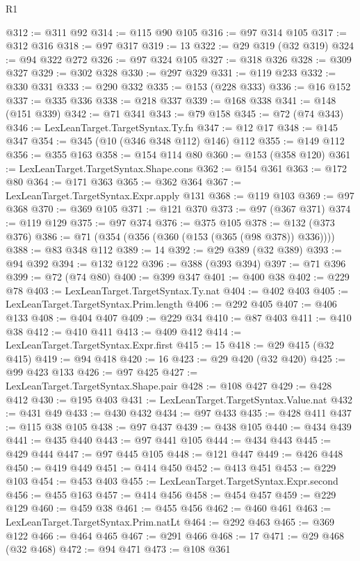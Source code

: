 \begin{lexlean}{R1}
\begin{coremodule}
@312 := @311 @92
@314 := @115 @90 @105
@316 := @97 @314 @105
@317 := @312 @316
@318 := @97 @317
@319 := 13
@322 := @29 @319 (@32 @319)
@324 := @94 @322 @272
@326 := @97 @324 @105
@327 := @318 @326
@328 := @309 @327
@329 := @302 @328
@330 := @297 @329
@331 := @119 @233
@332 := @330 @331
@333 := @290 @332
@335 := @153 (@228 @333)
@336 := @16 @152
@337 := @335 @336
@338 := @218 @337
@339 := @168 @338
@341 := @148 (@151 @339)
@342 := @71 @341
@343 := @79 @158
@345 := @72 (@74 @343)
@346 := LexLeanTarget.TargetSyntax.Ty.fn
@347 := @12 @17
@348 := @145 @347
@354 := @345 (@10 (@346 @348 @112) @146) @112
@355 := @149 @112
@356 := @355 @163
@358 := @154 @114 @80
@360 := @153 (@358 @120)
@361 := LexLeanTarget.TargetSyntax.Shape.cons
@362 := @154 @361
@363 := @172 @80
@364 := @171 @363
@365 := @362 @364
@367 := LexLeanTarget.TargetSyntax.Expr.apply @131
@368 := @119 @103
@369 := @97 @368
@370 := @369 @105
@371 := @121 @370
@373 := @97 (@367 @371)
@374 := @119 @129
@375 := @97 @374
@376 := @375 @105
@378 := @132 (@373 @376)
@386 := @71 (@354 (@356 (@360 (@153 (@365 (@98 @378)) @336))))
@388 := @83 @348 @112
@389 := 14
@392 := @29 @389 (@32 @389)
@393 := @94 @392
@394 := @132 @122
@396 := @388 (@393 @394)
@397 := @71 @396
@399 := @72 (@74 @80)
@400 := @399 @347
@401 := @400 @38
@402 := @229 @78
@403 := LexLeanTarget.TargetSyntax.Ty.nat
@404 := @402 @403
@405 := LexLeanTarget.TargetSyntax.Prim.length
@406 := @292 @405
@407 := @406 @133
@408 := @404 @407
@409 := @229 @34
@410 := @87 @403
@411 := @410 @38
@412 := @410 @411
@413 := @409 @412
@414 := LexLeanTarget.TargetSyntax.Expr.first
@415 := 15
@418 := @29 @415 (@32 @415)
@419 := @94 @418
@420 := 16
@423 := @29 @420 (@32 @420)
@425 := @99 @423 @133
@426 := @97 @425
@427 := LexLeanTarget.TargetSyntax.Shape.pair
@428 := @108 @427
@429 := @428 @412
@430 := @195 @403
@431 := LexLeanTarget.TargetSyntax.Value.nat
@432 := @431 @49
@433 := @430 @432
@434 := @97 @433
@435 := @428 @411
@437 := @115 @38 @105
@438 := @97 @437
@439 := @438 @105
@440 := @434 @439
@441 := @435 @440
@443 := @97 @441 @105
@444 := @434 @443
@445 := @429 @444
@447 := @97 @445 @105
@448 := @121 @447
@449 := @426 @448
@450 := @419 @449
@451 := @414 @450
@452 := @413 @451
@453 := @229 @103
@454 := @453 @403
@455 := LexLeanTarget.TargetSyntax.Expr.second
@456 := @455 @163
@457 := @414 @456
@458 := @454 @457
@459 := @229 @129
@460 := @459 @38
@461 := @455 @456
@462 := @460 @461
@463 := LexLeanTarget.TargetSyntax.Prim.natLt
@464 := @292 @463
@465 := @369 @122
@466 := @464 @465
@467 := @291 @466
@468 := 17
@471 := @29 @468 (@32 @468)
@472 := @94 @471
@473 := @108 @361

\end{coremodule}
\end{lexlean}
